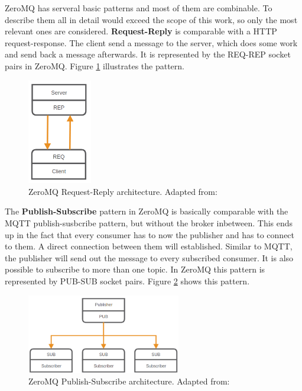 ZeroMQ has serveral basic patterns and most of them are combinable.
To describe them all in detail would exceed the scope of this work, so only the most relevant ones are considered.\newline
\textbf{Request-Reply} is comparable with a \ac{HTTP} request-response.
The client send a message to the server, which does some work and send back a message afterwards.
It is represented by the REQ-REP socket pairs in ZeroMQ.
Figure \ref{fig:zeromq_req_rep} illustrates the pattern.\newline
\begin{figure}[H]
    \centering
    \includegraphics[width=0.25\textwidth]{resources/images/zeromq-req-rep.png}
    \caption[ZeroMQ Request-Reply architecture]{ZeroMQ Request-Reply architecture. Adapted from: \autocite{ZeroMQ:Guide}}
    \label{fig:zeromq_req_rep}
\end{figure}
The \textbf{Publish-Subscribe} pattern in ZeroMQ is basically comparable with the MQTT publish-susbcribe pattern, but without the broker inbetween.
This ends up in the fact that every consumer has to now the publisher and has to connect to them.
A direct connection between them will established.
Similar to MQTT, the publisher will send out the message to every subscribed consumer.
It is also possible to subscribe to more than one topic.
In ZeroMQ this pattern is represented by PUB-SUB socket pairs.
Figure \ref{fig:zeromq_pub_sub} shows this pattern.
\begin{figure}[H]
    \centering
    \includegraphics[width=0.6\textwidth]{resources/images/zeromq-pub-sub.png}
    \caption[ZeroMQ Publish-Subscribe architecture]{ZeroMQ Publish-Subscribe architecture. Adapted from: \autocite{ZeroMQ:Guide}}
    \label{fig:zeromq_pub_sub}
\end{figure}
